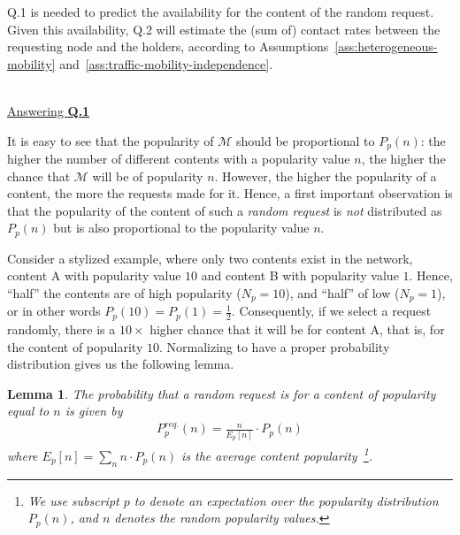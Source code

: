 \documentclass[journal]{IEEEtran}
\newtheorem{lemma}{Lemma}
\begin{document}
Q.1 is needed to predict the availability for the content of the random request. Given this availability, Q.2 will estimate the (sum of) contact rates between the requesting node and the holders, according to Assumptions~\ref{ass:heterogeneous-mobility} and~\ref{ass:traffic-mobility-independence}. 

~\\
\noindent\underline{Answering \textbf{Q.1}}

It is easy to see that the popularity of $\mathcal{M}$ should be proportional to $P_{p}(n)$: the higher the number of different contents with a popularity value $n$, the higher the chance that $\mathcal{M}$ will be of popularity $n$. However, the higher the popularity of a content, the more the requests made for it. Hence, a first important observation is that the popularity of the content of such a \textit{random request} is \textit{not} distributed as $P_{p}(n)$ but is also proportional to the popularity value $n$.

Consider a stylized example, where only two contents exist in the network, content A with popularity value $10$ and content B with popularity value $1$. Hence, ``half'' the contents are of high popularity ($N_{p}=10$), and ``half'' of low ($N_{p}=1$), or in other words $P_{p}(10) = P_{p}(1) = \frac{1}{2}$.  Consequently, if we select a request randomly, there is a $10\times$ higher chance that it will be for content A, that is, for the content of popularity $10$. Normalizing to have a proper probability distribution gives us the following lemma.

\begin{lemma}\label{thm:Pint-popularity}
The probability that a random request is for a content of popularity equal to $n$ is given by
\begin{align}
 P_{p}^{req.}(n) = \frac{n}{E_{p}[n]}\cdot P_{p}(n)\nonumber
\end{align}
where $E_{p}[n] = \sum_{n}n\cdot P_{p}(n)$ is the average content popularity~\footnote{We use subscript $p$ to denote an expectation over the popularity distribution $P_{p}(n)$, and $n$ denotes the random popularity values.}.
\end{lemma}
\end{document}
